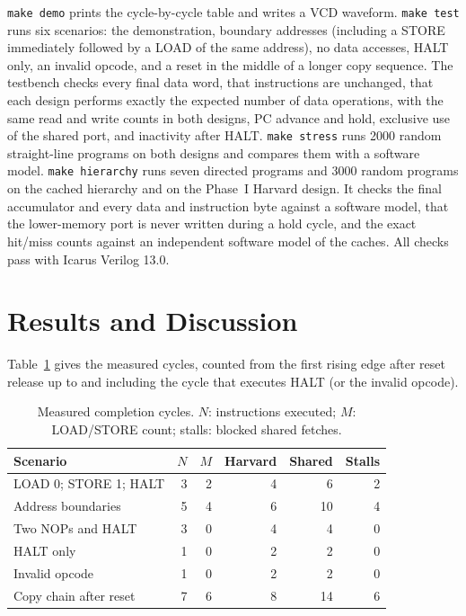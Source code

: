 \documentclass[conference,a4paper]{IEEEtran}
\begin{document}
\texttt{make demo} prints the cycle-by-cycle table and writes a VCD
waveform. \texttt{make test} runs six scenarios: the demonstration,
boundary addresses (including a STORE immediately followed by a LOAD of
the same address), no data accesses, HALT only, an invalid opcode, and a
reset in the middle of a longer copy sequence. The testbench checks every
final data word, that instructions are unchanged, that each design
performs exactly the expected number of data operations, with the same
read and write counts in both designs, PC advance and hold, exclusive use of the shared port,
and inactivity after HALT. \texttt{make stress} runs 2000 random
straight-line programs on both designs and compares them with a software
model. \texttt{make hierarchy} runs seven directed programs and 3000 random
programs on the cached hierarchy and on the Phase~I Harvard design. It checks
the final accumulator and every data and instruction byte against a software
model, that the lower-memory port is never written during a hold cycle, and the
exact hit/miss counts against an independent software model of the caches.
All checks pass with Icarus Verilog 13.0.

\section{Results and Discussion}
Table~\ref{tab:results} gives the measured cycles, counted from the
first rising edge after reset release up to and including the cycle that
executes HALT (or the invalid opcode).

\begin{table}[t]
\caption{Measured completion cycles. $N$: instructions executed;
$M$: LOAD/STORE count; stalls: blocked shared fetches.}
\label{tab:results}
\centering
\setlength{\tabcolsep}{3pt}
\begin{tabular}{lrrrrr}
\hline
Scenario & $N$ & $M$ & Harvard & Shared & Stalls \\ \hline
LOAD 0; STORE 1; HALT & 3 & 2 & 4 & 6 & 2 \\
Address boundaries & 5 & 4 & 6 & 10 & 4 \\
Two NOPs and HALT & 3 & 0 & 4 & 4 & 0 \\
HALT only & 1 & 0 & 2 & 2 & 0 \\
Invalid opcode & 1 & 0 & 2 & 2 & 0 \\
Copy chain after reset & 7 & 6 & 8 & 14 & 6 \\ \hline
\end{tabular}
\end{table}
\end{document}
